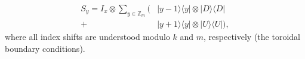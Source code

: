 \begin{equation}
\begin{aligned}
S_y = I_x \otimes \sum_{y \in \mathbb{Z}_m} \Big( &|y-1\rangle\langle y| \otimes |D\rangle\langle D| \\
+ &|y+1\rangle\langle y| \otimes |U\rangle\langle U| \Big),
\end{aligned}
\label{eq:shift_y}
\end{equation}
where all index shifts are understood modulo \(k\) and \(m\),
respectively (the toroidal boundary conditions).
